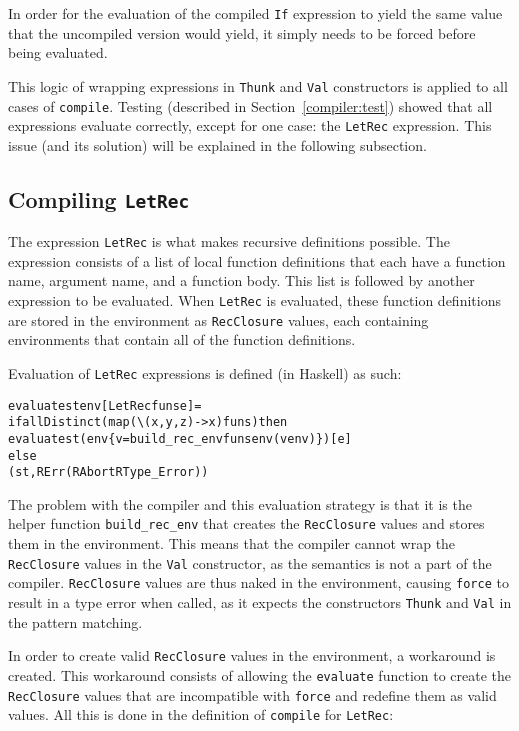 \noindent In order for the evaluation of the compiled \texttt{If} expression to
yield the same value that the uncompiled version would yield, it simply
needs to be forced before being evaluated.

This logic of wrapping expressions in \texttt{Thunk} and \texttt{Val}
constructors is applied to all cases of \texttt{compile}. Testing (described in
Section~\ref{compiler:test}) showed that all
expressions evaluate correctly, except for one case: the \texttt{LetRec}
expression. This issue (and its solution) will be explained in the following
subsection.

\subsection{Compiling \texttt{LetRec}}
\label{com:letrec}
The expression \texttt{LetRec} is what makes recursive definitions possible.
The expression consists of a list of local function definitions that each have a
function name, argument name, and a function body. This list is followed by
another expression to be evaluated. When \texttt{LetRec} is evaluated, these
function definitions
are stored in the environment as \texttt{RecClosure} values, each containing
environments that contain all of the function definitions.

Evaluation of \texttt{LetRec} expressions is defined (in Haskell) as such:

\begin{alltt}
  evaluate st env [LetRec funs e] =
    if allDistinct (map (\textbackslash(x,y,z) -> x) funs) then
      evaluate st (env \{v = build_rec_env funs env (v env)\}) [e]
    else
      (st, RErr (RAbort RType_Error))
\end{alltt}

\noindent The problem with the compiler and this evaluation strategy is that it
is the helper function \texttt{build\_rec\_env} that
creates the \texttt{RecClosure} values and stores them in the environment. This
means that the compiler cannot wrap the \texttt{RecClosure} values in the
\texttt{Val} constructor, as the semantics is not a part of the compiler.
\texttt{RecClosure} values are thus naked in the environment, causing \texttt{force}
to result in a type error when called, as it expects the constructors
\texttt{Thunk} and \texttt{Val} in the pattern matching.

In order to create valid \texttt{RecClosure} values in the environment, a
workaround is created. This workaround
consists of allowing the \texttt{evaluate} function to create the
\texttt{RecClosure} values that are incompatible with \texttt{force} and
redefine them as valid values.
All this is done in the definition of
\texttt{compile} for \texttt{LetRec}:

